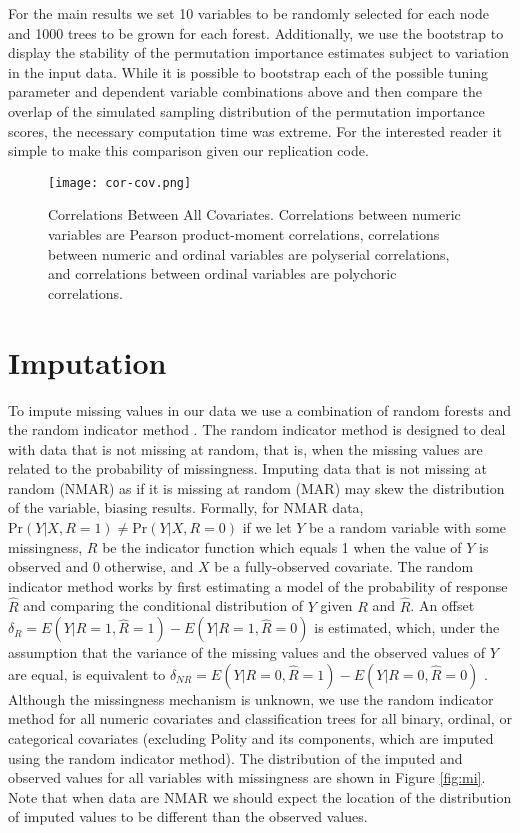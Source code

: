 \documentclass[11pt]{article}
\begin{document}
For the main results we set 10 variables to be randomly selected for each node and 1000 trees to be grown for each forest. Additionally, we use the bootstrap to display the stability of the permutation importance estimates subject to variation in the input data. While it is possible to bootstrap each of the possible tuning parameter and dependent variable combinations above and then compare the overlap of the simulated sampling distribution of the permutation importance scores, the necessary computation time was extreme. For the interested reader it simple to make this comparison given our replication code.

\begin{figure}[!htpb]
\texttt{[image: cor-cov.png]}
\caption{Correlations Between All Covariates. Correlations between numeric variables are Pearson product-moment correlations, correlations between numeric and ordinal variables are polyserial correlations, and correlations between ordinal variables are polychoric correlations.} 
\label{fig:cor-cov}
\end{figure}

\section*{Imputation}

To impute missing values in our data we use a combination of random forests and the random indicator method \citep{buuren2011mice,jolani2012}. The random indicator method is designed to deal with data that is not missing at random, that is, when the missing values are related to the probability of missingness. Imputing data that is not missing at random (NMAR) as if it is missing at random (MAR) may skew the distribution of the variable, biasing results. Formally, for NMAR data, $\text{Pr}(Y|X, R=1) \neq \text{Pr}(Y|X, R=0)$ if we let $Y$ be a random variable with some missingness, $R$ be the indicator function which equals 1 when the value of $Y$ is observed and 0 otherwise, and $X$ be a fully-observed covariate. The random indicator method works by first estimating a model of the probability of response $\hat{R}$ and comparing the conditional distribution of $Y$ given $R$ and $\hat{R}$. An offset $\delta_R = E(Y|R=1,\hat{R}=1) - E(Y|R=1,\hat{R}=0)$ is estimated, which, under the assumption that the variance of the missing values and the observed values of $Y$ are equal, is equivalent to $\delta_{NR} = E(Y|R=0,\hat{R}=1) - E(Y|R=0,\hat{R}=0)$ \citep{jolani2012}. Although the missingness mechanism is unknown, we use the random indicator method for all numeric covariates and classification trees for all binary, ordinal, or categorical covariates (excluding Polity and its components, which are imputed using the random indicator method). The distribution of the imputed and observed values for all variables with missingness are shown in Figure \ref{fig:mi}. Note that when data are NMAR we should expect the location of the distribution of imputed values to be different than the observed values.
\end{document}
